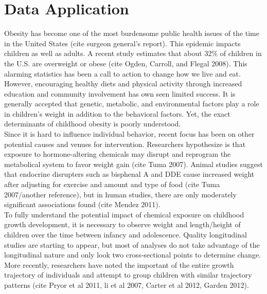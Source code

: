 \chapter{Data Application}

Obesity has become one of the most burdensome public health issues of the time in the United States (cite surgeon general's report).  This epidemic impacts children as well as adults.  A recent study estimates that about 32\% of children in the U.S. are overweight or obese (cite Ogden, Carroll, and Flegal 2008). This alarming statistics has been a call to action to change how we live and eat. However, encouraging healthy diets and physical activity through increased education and community involvement has own seen limited success.  It is generally accepted that genetic, metabolic, and environmental factors play a role in children's weight in addition to the behavioral factors. Yet, the exact determinants of childhood obesity is poorly understood.\\

Since it is hard to influence individual behavior, recent focus has been on other potential causes and venues for intervention. Researchers hypothesize is that exposure to hormone-altering chemicals may disrupt and reprogram the metabolical system to favor weight gain (cite Tuma 2007). Animal studies suggest that endocrine disrupters such as bisphenal A and DDE cause increased weight after adjusting for exercise and amount and type of food (cite Tuma 2007/another reference), but in human studies, there are only moderately significant associations found (cite Mendez 2011).\\
 
 To fully understand the potential impact of chemical exposure on childhood growth development, it is necessary to observe weight and length/height of children over the time between infancy and adolescence. Quality longitudinal studies are starting to appear, but most of analyses do not take advantage of the longitudinal nature and only look two cross-sectional points to determine change. More recently, researchers have noted the important of the entire growth trajectory of individuals and attempt to group children with similar trajectory patterns (cite Pryor et al 2011, li et al 2007, Carter et al 2012, Garden 2012). \\

